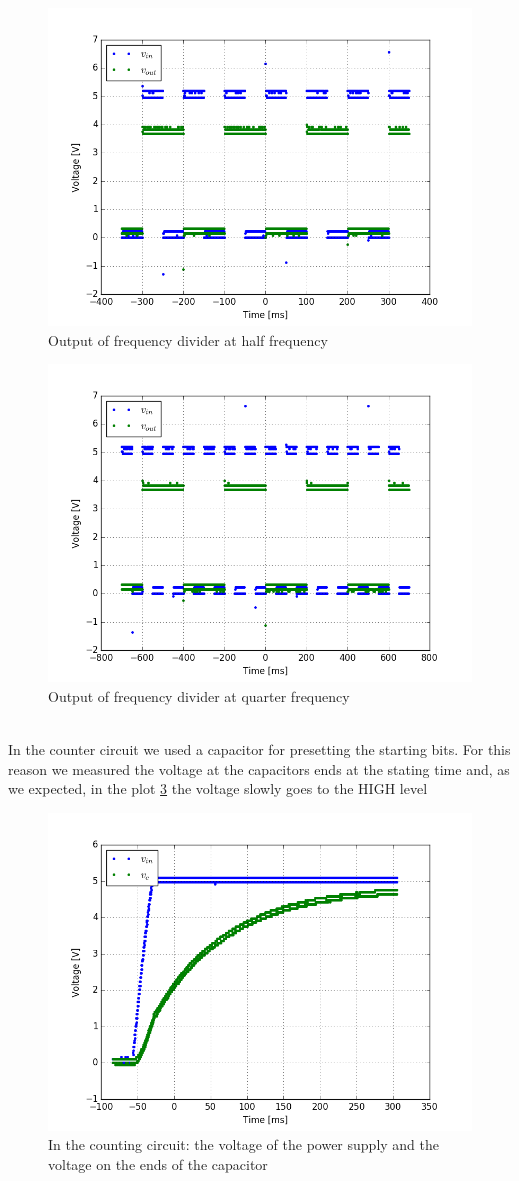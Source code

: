 \begin{figure}[H]
\centering
\includegraphics[width=.7\textwidth]{11/freq_div_m.png}
\caption{Output of frequency divider at half frequency}\label{freq_div_m}
\end{figure}
\begin{figure}[H]
\centering
\includegraphics[width=.7\textwidth]{11/freq_div_q.png}
\caption{Output of frequency divider at quarter frequency}\label{freq_div_q}
\end{figure}\\
In the counter circuit we used a capacitor for presetting the starting bits. For this reason we measured the voltage at the capacitors ends at the stating time and, as we expected, in the plot \ref{start_count} the voltage slowly goes to the HIGH level
\begin{figure}[H]
\centering
\includegraphics[width=.7\textwidth]{11/start_count.png}
\caption{In the counting circuit: the voltage of the power supply and the voltage on the ends of the capacitor}\label{start_count}
\end{figure}